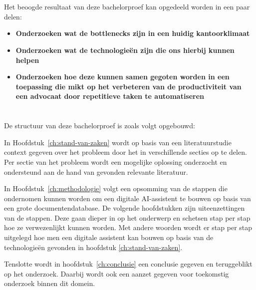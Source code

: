 \section{}%
\label{sec:onderzoeksdoelstelling}
Het beoogde resultaat van deze bachelorproef kan opgedeeld worden in een paar delen:
\begin{itemize}
	\item \textbf{Onderzoeken wat de bottlenecks zijn in een huidig kantoorklimaat}
	\item \textbf{Onderzoeken wat de technologieën zijn die ons hierbij kunnen helpen}
	\item \textbf{Onderzoeken hoe deze kunnen samen gegoten worden in een toepassing die mikt op het verbeteren van de productiviteit van een advocaat door repetitieve taken te automatiseren}
\end{itemize}


\section{}%
\label{sec:opzet-bachelorproef}


De structuur van deze bachelorproef is zoals volgt opgebouwd:

In Hoofdstuk~\ref{ch:stand-van-zaken} wordt op basis van een literatuurstudie context gegeven over het probleem door het in verschillende secties op te delen. 
Per sectie van het probleem wordt een mogelijke oplossing onderzocht en ondersteund aan de hand van gevonden relevante literatuur. 

In Hoofdstuk~\ref{ch:methodologie} volgt een opsomming van de stappen die ondernomen kunnen worden om een digitale AI-assistent te bouwen op basis van een grote documentendatabase. 
De volgende hoofdstukken zijn uiteenzettingen van de stappen. 
Deze gaan dieper in op het onderwerp en schetsen stap per stap hoe ze verwezenlijkt kunnen worden. 
Met andere woorden wordt er stap per stap uitgelegd hoe men een digitale assistent kan bouwen op basis van de technologieën gevonden in hoofdstuk \ref{ch:stand-van-zaken}.

Tenslotte wordt in hoofdstuk~\ref{ch:conclusie} een conclusie gegeven en teruggeblikt op het onderzoek. 
Daarbij wordt ook een aanzet gegeven voor toekomstig onderzoek binnen dit domein.
